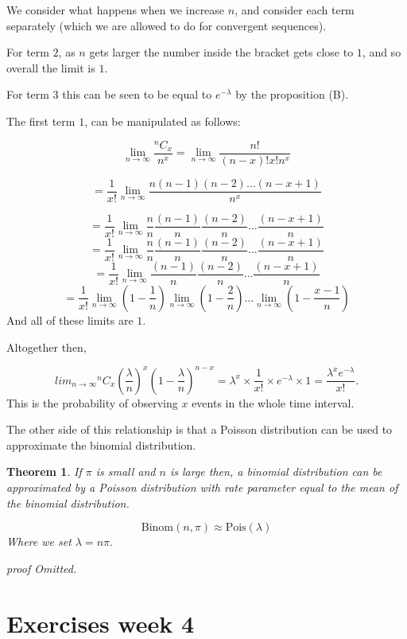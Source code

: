 \documentclass[
]{book}
\newtheorem{theorem}{Theorem}[chapter]
\theoremstyle{definition}
\theoremstyle{definition}
\theoremstyle{definition}
\theoremstyle{definition}
\theoremstyle{remark}
\begin{document}
We consider what happens when we increase \(n\), and consider each term separately (which we are allowed to do for convergent sequences).

For term \(2\), as \(n\) gets larger the number inside the bracket gets close to \(1\), and so overall the limit is \(1\).

For term \(3\) this can be seen to be equal to \(e^{-\lambda}\) by the proposition (B).

The first term \(1\), can be manipulated as follows:

\[\lim_{n\to \infty}\frac{^nC_{x}}{n^x} = \lim_{n\to \infty} \frac{n!}{(n-x)!x!n^x}\]

\[ =\frac{1}{x!}  \lim_{n\to \infty} \frac{n(n-1)(n-2)\dots(n-x+1)}{n^x}\]

\[ =\frac{1}{x!}  \lim_{n\to \infty} \frac{n}{n}\frac{(n-1)}{n}\frac{(n-2)}{n}\dots \frac{(n-x+1)}{n}\]
\[ =\frac{1}{x!}  \lim_{n\to \infty} \frac{n}{n}\frac{(n-1)}{n}\frac{(n-2)}{n}\dots \frac{(n-x+1)}{n}\]
\[ =\frac{1}{x!}  \lim_{n\to \infty} \frac{(n-1)}{n}\frac{(n-2)}{n}\dots \frac{(n-x+1)}{n}\]
\[ =\frac{1}{x!}  \lim_{n\to \infty} \left(1 - \frac{1}{n}\right)\lim_{n\to \infty}\left(1 - \frac{2}{n}\right)\dots \lim_{n\to \infty} \left(1 - \frac{x-1}{n}\right)\]
And all of these limits are \(1\).

Altogether then,

\[lim_{n\to \infty} {}^nC_{x} \left(\frac{\lambda}{n}\right)^x \left( 1- \frac{\lambda}{n}\right)^{n-x}  = \lambda^x \times \frac{1}{x!} \times e^{-\lambda}\times 1 = \frac{\lambda^xe^{-\lambda}}{x!}.\]
This is the probability of observing \(x\) events in the whole time interval.

The other side of this relationship is that a Poisson distribution can be used to approximate the binomial distribution.

\begin{theorem}
If \(\pi\) is small and \(n\) is large then, a binomial distribution can be approximated by a Poisson distribution with rate parameter equal to the mean of the binomial distribution.

\[\text{Binom}(n,\pi) \approx \text{Pois} (\lambda)\]
Where we set \(\lambda = n\pi.\)

\emph{proof}
Omitted.
\end{theorem}

\hypertarget{exercises-week-4}{%
\section{Exercises week 4}\label{exercises-week-4}}
\end{document}
